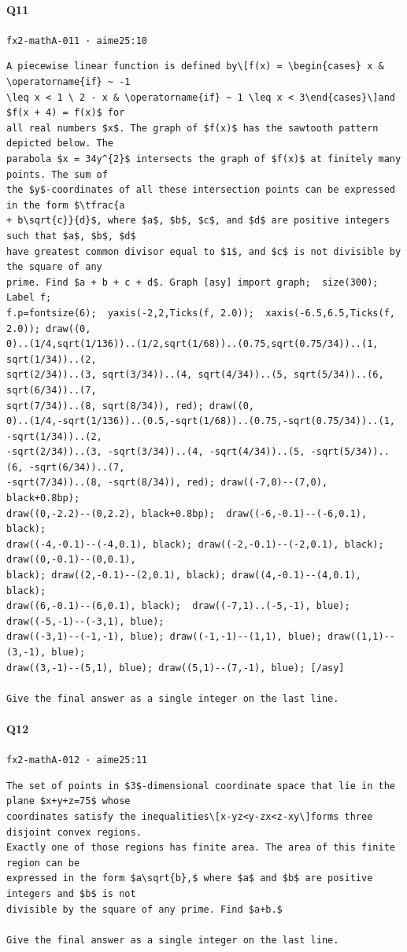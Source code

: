 \documentclass[10pt]{article}
\begin{document}
\paragraph{Q11} \texttt{fx2-mathA-011  ·  aime25:10}
\begin{verbatim}
A piecewise linear function is defined by\[f(x) = \begin{cases} x & \operatorname{if} ~ -1
\leq x < 1 \ 2 - x & \operatorname{if} ~ 1 \leq x < 3\end{cases}\]and $f(x + 4) = f(x)$ for
all real numbers $x$. The graph of $f(x)$ has the sawtooth pattern depicted below. The
parabola $x = 34y^{2}$ intersects the graph of $f(x)$ at finitely many points. The sum of
the $y$-coordinates of all these intersection points can be expressed in the form $\tfrac{a
+ b\sqrt{c}}{d}$, where $a$, $b$, $c$, and $d$ are positive integers such that $a$, $b$, $d$
have greatest common divisor equal to $1$, and $c$ is not divisible by the square of any
prime. Find $a + b + c + d$. Graph [asy] import graph;  size(300);  Label f;
f.p=fontsize(6);  yaxis(-2,2,Ticks(f, 2.0));  xaxis(-6.5,6.5,Ticks(f, 2.0)); draw((0,
0)..(1/4,sqrt(1/136))..(1/2,sqrt(1/68))..(0.75,sqrt(0.75/34))..(1, sqrt(1/34))..(2,
sqrt(2/34))..(3, sqrt(3/34))..(4, sqrt(4/34))..(5, sqrt(5/34))..(6, sqrt(6/34))..(7,
sqrt(7/34))..(8, sqrt(8/34)), red); draw((0,
0)..(1/4,-sqrt(1/136))..(0.5,-sqrt(1/68))..(0.75,-sqrt(0.75/34))..(1, -sqrt(1/34))..(2,
-sqrt(2/34))..(3, -sqrt(3/34))..(4, -sqrt(4/34))..(5, -sqrt(5/34))..(6, -sqrt(6/34))..(7,
-sqrt(7/34))..(8, -sqrt(8/34)), red); draw((-7,0)--(7,0), black+0.8bp);
draw((0,-2.2)--(0,2.2), black+0.8bp);  draw((-6,-0.1)--(-6,0.1), black);
draw((-4,-0.1)--(-4,0.1), black); draw((-2,-0.1)--(-2,0.1), black); draw((0,-0.1)--(0,0.1),
black); draw((2,-0.1)--(2,0.1), black); draw((4,-0.1)--(4,0.1), black);
draw((6,-0.1)--(6,0.1), black);  draw((-7,1)..(-5,-1), blue); draw((-5,-1)--(-3,1), blue);
draw((-3,1)--(-1,-1), blue); draw((-1,-1)--(1,1), blue); draw((1,1)--(3,-1), blue);
draw((3,-1)--(5,1), blue); draw((5,1)--(7,-1), blue); [/asy]

Give the final answer as a single integer on the last line.
\end{verbatim}
\paragraph{Q12} \texttt{fx2-mathA-012  ·  aime25:11}
\begin{verbatim}
The set of points in $3$-dimensional coordinate space that lie in the plane $x+y+z=75$ whose
coordinates satisfy the inequalities\[x-yz<y-zx<z-xy\]forms three disjoint convex regions.
Exactly one of those regions has finite area. The area of this finite region can be
expressed in the form $a\sqrt{b},$ where $a$ and $b$ are positive integers and $b$ is not
divisible by the square of any prime. Find $a+b.$

Give the final answer as a single integer on the last line.
\end{verbatim}
\end{document}
